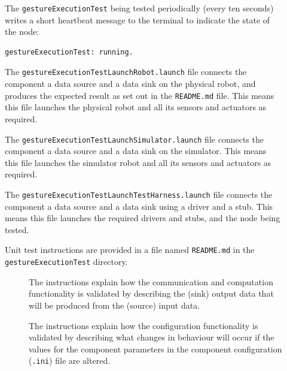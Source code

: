 \documentclass{CSSRforAfrica}
\newcommand{\checkboxChecked}{\fbox{\ding{51}}} %
\newcommand{\checkboxDashed}{\fbox{--}}         %
\begin{document}
\begin{description}
\item[\checkboxChecked]  The {\small \verb+gestureExecutionTest+} being tested periodically (every ten seconds) writes a short heartbeat message to
 the terminal to indicate the state of the node:
\begin{verbatim}
gestureExecutionTest: running.
\end{verbatim}

\item[\checkboxChecked] The {\small \verb+gestureExecutionTestLaunchRobot.launch+} file  connects the component a data source and a data sink on the physical robot, and produces the expected result as set out in the  {\small \verb+README.md+}  file.    This means this file launches the physical robot and all its sensors and actuators as required.

\item[\checkboxDashed] The {\small \verb+gestureExecutionTestLaunchSimulator.launch+} file  connects the component a data source and a data sink on the simulator.   This means this file launches the simulator robot and all its sensors and actuators as required.

\item[\checkboxChecked] The {\small \verb+gestureExecutionTestLaunchTestHarness.launch+} file  connects the component a data source and a data sink using a driver and a stub.   This means this file launches the required drivers and stubs, and the node being tested.

\item[\checkboxChecked] Unit test instructions are provided in a file named {\small \verb+README.md+} in the  {\small \verb+gestureExecutionTest+} directory. 


\begin{description}

\item[\checkboxChecked] The instructions explain how the communication and computation functionality is validated by describing the (sink) output data that will be produced from the (source) input data.  

\item[\checkboxChecked] The instructions explain how the configuration functionality is validated by describing what changes in behaviour will occur if the values for the component parameters in the component configuration ({\small \verb+.ini+}) file are altered.

\end{description}
\end{description} 
\newpage
\end{document}

